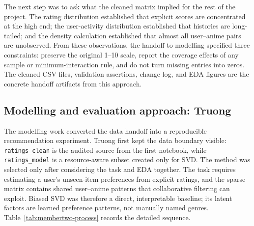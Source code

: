 \documentclass[12pt,a4paper]{article}
\newcommand{\membertwo}{Truong Nhat Truong -- 29211164915}
\renewcommand{\membertwo}{Truong }
\begin{document}
The next step was to ask what the cleaned matrix implied for the rest of the project. The rating distribution established that explicit scores are concentrated at the high end; the user-activity distribution established that histories are long-tailed; and the density calculation established that almost all user--anime pairs are unobserved. From these observations, the handoff to modelling specified three constraints: preserve the original 1--10 scale, report the coverage effects of any sample or minimum-interaction rule, and do not turn missing entries into zeros. The cleaned CSV files, validation assertions, change log, and EDA figures are the concrete handoff artifacts from this approach.

\subsection{Modelling and evaluation approach: \membertwo}
The modelling work converted the data handoff into a reproducible recommendation experiment. \membertwo first kept the data boundary visible: \texttt{ratings\_clean} is the audited source from the first notebook, while \texttt{ratings\_model} is a resource-aware subset created only for SVD. The method was selected only after considering the task and EDA together. The task requires estimating a user's unseen-item preferences from explicit ratings, and the sparse matrix contains shared user--anime patterns that collaborative filtering can exploit. Biased SVD was therefore a direct, interpretable baseline; its latent factors are learned preference patterns, not manually named genres. Table~\ref{tab:membertwo-process} records the detailed sequence.
\end{document}

